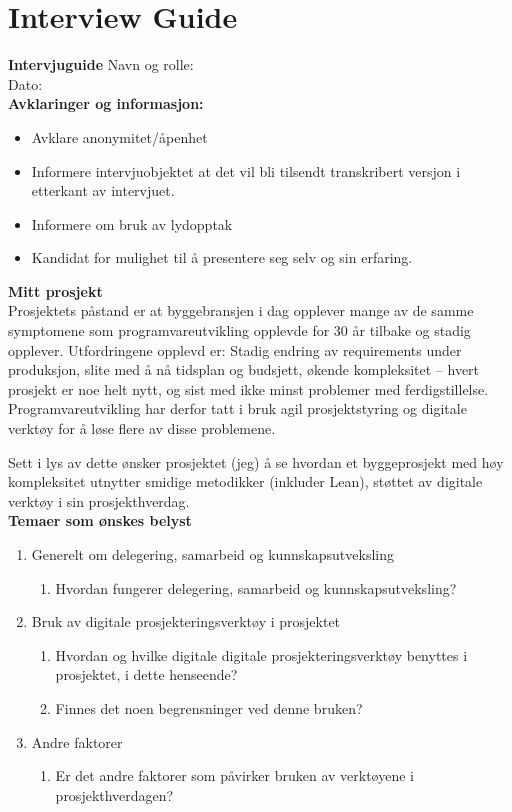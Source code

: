 \let\cleardoublepage\clearpage

\chapter{Interview Guide} \label{apx:interview_guide}
\noindent\textbf{Intervjuguide}
Navn og rolle: \\
Dato: \\

\noindent\textbf{Avklaringer og informasjon:} 
\begin{itemize}
    \item Avklare anonymitet/åpenhet
    \item Informere intervjuobjektet at det vil bli tilsendt transkribert versjon i etterkant av intervjuet.
    \item Informere om bruk av lydopptak
    \item Kandidat for mulighet til å presentere seg selv og sin erfaring.
\end{itemize}

\noindent\textbf{Mitt prosjekt} \\
Prosjektets påstand er at byggebransjen i dag opplever mange av de samme symptomene som programvareutvikling opplevde for 30 år tilbake og stadig opplever. Utfordringene opplevd er: Stadig endring av requirements under produksjon, slite med å nå tidsplan og budsjett, økende kompleksitet – hvert prosjekt er noe helt nytt, og sist med ikke minst problemer med ferdigstillelse. Programvareutvikling har derfor tatt i bruk agil prosjektstyring og digitale verktøy for å løse flere av disse problemene.

Sett i lys av dette ønsker prosjektet (jeg) å se hvordan et byggeprosjekt med høy kompleksitet utnytter smidige metodikker (inkluder Lean), støttet av digitale verktøy i sin prosjekthverdag. \\

\noindent\textbf{Temaer som ønskes belyst}
\begin{enumerate}
    \item Generelt om delegering, samarbeid og kunnskapsutveksling
    \begin{enumerate}
        \item Hvordan fungerer delegering, samarbeid og kunnskapsutveksling?
    \end{enumerate}
    \item Bruk av digitale prosjekteringsverktøy i prosjektet
    \begin{enumerate}
        \item Hvordan og hvilke digitale digitale prosjekteringsverktøy benyttes i\\ prosjektet, i dette henseende?
        \item Finnes det noen begrensninger ved denne bruken?
    \end{enumerate}
    \item Andre faktorer
    \begin{enumerate}
        \item Er det andre faktorer som påvirker bruken av verktøyene i prosjekthverdagen?
    \end{enumerate}
\end{enumerate}